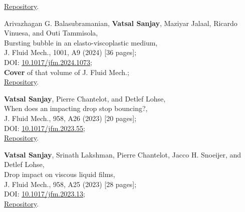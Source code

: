 	\faGithub\hspace{0.2em}\href{https://github.com/comphy-lab/concentricWave}{Repository}.

	\item Arivazhagan G. Balasubramanian, \textbf{Vatsal Sanjay}, Maziyar Jalaal, Ricardo Vinuesa, and Outi Tammisola,\\
	Bursting bubble in an elasto-viscoplastic medium,\\
	J. Fluid Mech., 1001, A9 (2024) [36 pages];\\
	\faFile\hspace{0.2em}DOI: \href{https://doi.org/10.1017/jfm.2024.1073}{10.1017/jfm.2024.1073};\\
	\faStar\hspace{0.2em}\textbf{Cover} of that volume of J. Fluid Mech.;\\
	\faGithub\hspace{0.2em}\href{https://github.com/comphy-lab/2023_Bubble-bursting-in-an-elasto-viscoplastic-medium}{Repository}.

	\item \textbf{Vatsal Sanjay}, Pierre Chantelot, and Detlef Lohse,\\
	When does an impacting drop stop bouncing?,\\
	J. Fluid Mech., 958, A26 (2023) [20 pages];\\
	\faFile\hspace{0.2em}DOI: \href{https://doi.org/10.1017/jfm.2023.55}{10.1017/jfm.2023.55};\\
	\faGithub\hspace{0.2em}\href{https://github.com/comphy-lab/Drop-Impact}{Repository}.

	\item \textbf{Vatsal Sanjay}, Srinath Lakshman, Pierre Chantelot, Jacco H. Snoeijer, and Detlef Lohse,\\
	Drop impact on viscous liquid films,\\
	J. Fluid Mech., 958, A25 (2023) [28 pages];\\
	\faFile\hspace{0.2em}DOI: \href{https://doi.org/10.1017/jfm.2023.13}{10.1017/jfm.2023.13};\\
	\faGithub\hspace{0.2em}\href{https://github.com/VatsalSy/Drop-impact-on-viscous-liquid-films}{Repository}.

